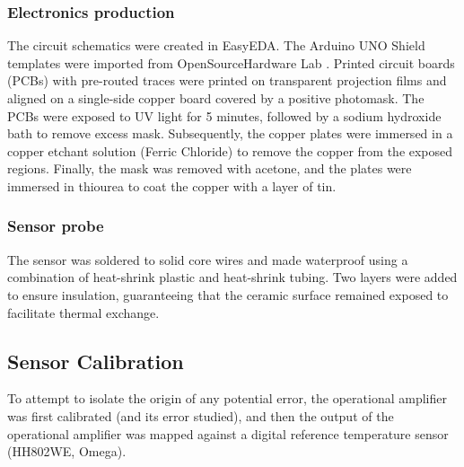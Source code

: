 \documentclass[conference]{IEEEtran}
\begin{document}

      \subsubsection{Electronics production}
      The circuit schematics were created in EasyEDA\cite{EasyEDAOnlinePCB}. The Arduino UNO Shield templates were imported from OpenSourceHardware Lab \cite{ArduinoShieldEasyEDA}.
      Printed circuit boards (PCBs) with pre-routed traces were printed on transparent projection films and aligned on a single-side copper board covered by a positive photomask.
      The PCBs were exposed to UV light for 5 minutes, followed by a sodium hydroxide bath to remove excess mask. Subsequently, the copper plates were immersed in a copper etchant solution (Ferric Chloride)
      to remove the copper from the exposed regions. Finally, the mask was removed with acetone, and the plates were immersed in thiourea to coat the copper with a layer of tin.
      \subsubsection{Sensor probe}
      The sensor was soldered to solid core wires and made waterproof using a combination of heat-shrink plastic and heat-shrink tubing. Two layers were added
      to ensure insulation, guaranteeing that the ceramic surface remained exposed to facilitate thermal exchange.
      \subsection{Sensor Calibration}
      To attempt to isolate the origin of any potential error, the operational amplifier was first calibrated (and its error studied), and then the output of the 
      operational amplifier was mapped against a digital reference temperature sensor (HH802WE, Omega).
\end{document}
